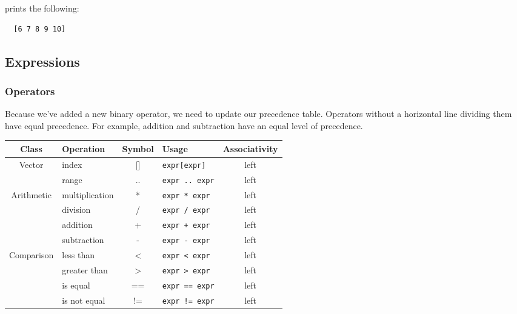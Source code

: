 \documentclass{article}
\begin{document}
prints the following:
\begin{lstlisting}
  [6 7 8 9 10]
\end{lstlisting}

\subsection{Expressions}
\subsubsection{Operators}
Because we've added a new binary operator, we need to update our precedence table. Operators without
a horizontal line dividing them have equal precedence. For example, addition and subtraction have an
equal level of precedence.
\begin{center}
  \begin{tabular}{|c|l|c|l|c|}
    \hline
    \textbf{Class} & \textbf{Operation} & \textbf{Symbol} & \textbf{Usage} &
      \textbf{Associativity} \\
    \hline
    Vector
    &index          & [] & \texttt{expr[expr]} & left \\ \cline{2-5}
    &range          & .. & \texttt{expr .. expr} & left \\
    \hline
    Arithmetic
    &multiplication & * & \texttt{expr * expr} & left \\
    &division       & / & \texttt{expr / expr} & left \\ \cline{2-5}
    &addition      & + & \texttt{expr + expr} & left \\
    &subtraction    & - & \texttt{expr - expr} & left \\
    \hline
    Comparison
    &less than      & <  & \texttt{expr < expr}  & left \\
    &greater than   & >  & \texttt{expr > expr}  & left \\ \cline{2-5}
    &is equal       & == & \texttt{expr == expr} & left \\
    &is not equal   & != & \texttt{expr != expr} & left \\
    \hline
  \end{tabular}
\end{center}
\end{document}
